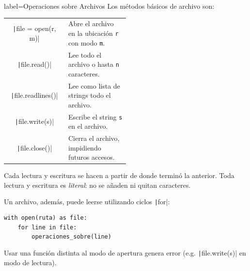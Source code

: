 
\begin{contentbox}{label=Operaciones sobre Archivos}
    Los métodos básicos de archivo son:
    
    \begin{tabular}{C|p{0.5\linewidth}}
        \small\texttt|file = open(r, m)| & Abre el archivo en la ubicación \texttt{r} con modo \texttt{m}. \\
        \texttt|file.read()| &  Lee todo el archivo o hasta \texttt{n} caracteres. \\
        \texttt|file.readlines()| &  Lee como lista de strings todo el archivo. \\
        \texttt|file.write(s)| & Escribe el string \texttt{s} en el archivo. \\
        \texttt|file.close()| & Cierra el archivo, impidiendo futuros accesos. \\
    \end{tabular}
    
    Cada lectura y escritura se hacen a partir de donde terminó la anterior. Toda lectura y escritura es \emph{literal}: no se añaden ni quitan caracteres.

    Un archivo, además, puede leerse utilizando ciclos \texttt|for|:

    \begin{verbatim}
with open(ruta) as file:
    for line in file:
        operaciones_sobre(line)
    \end{verbatim}

    Usar una función distinta al modo de apertura genera error (e.g. \texttt|file.write(s)| en modo de lectura).
\end{contentbox}

